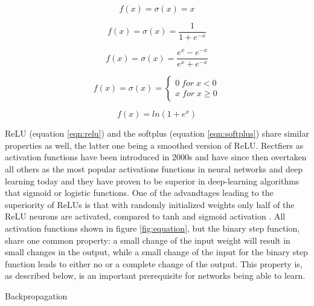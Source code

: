 \begin{equation}
  f(x) = \sigma(x) = x
  \label{eqn:ident}
\end{equation}

              
\begin{equation}
  f(x) = \sigma(x) =  \frac{1}{1+e^{-x}} 
  \label{eqn:sigmoid}
\end{equation}

\begin{equation}
  f(x) = \sigma(x) = \frac{e^x - e^{-x}}{e^x + e^{-x}}
  \label{eqn:tanh}
\end{equation}


\begin{equation}
  f(x)= \sigma(x) = \left\{
  \begin{array}{ll}
    0 \; for \; x < 0 \\ 
    x \; for \; x \geq 0
  \end{array}
\right .
\label{eqn:relu}
\end{equation}


\begin{equation}
  f(x) = ln(1+e^x)
  \label{eqn:softplus}
\end{equation}


ReLU (equation \ref{eqn:relu}) and the softplus (equation \ref{eqn:softplus}) share similar properties as
well, the latter one being a smoothed version of ReLU. Rectfiers as activation functions have been introduced
in 2000s \cite{hahnloser2000digital} and have since then overtaken all others as the most popular activations
functions in neural networks and deep learning today \cite{lecun2015deep} and they have proven to be superior
in deep-learning algorithms that sigmoid or logistic functions. One of the advandtages leading to the
superiority of ReLUs is that with randomly initialized weights only half of the ReLU neurons are activated,
compared to tanh and sigmoid activation \cite{glorot2011deep}. All activation functions shown in figure
\ref{fig:equation}, but the binary step function, share one common property: a small change of the input
weight will result in small changes in the output, while a small change of the input for the binary step
function leads to either no or a complete change of the output.  This property is, as described below, is an
important prerequisite for networks being able to learn.




Backpropagation \cite{rumelhart1988learning}




